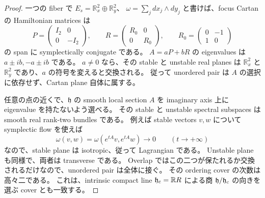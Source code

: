 \begin{proof}
一つの fiber で $E_s=\mathbb R_x^2\oplus\mathbb R_y^2$、
$\omega=\sum_j dx_j\wedge dy_j$ と書けば、focus Cartan の Hamiltonian matrices は
\[
 P=\begin{pmatrix}I_2&0\\0&-I_2\end{pmatrix},\qquad
 R=\begin{pmatrix}R_0&0\\0&R_0\end{pmatrix},\qquad
 R_0=\begin{pmatrix}0&-1\\1&0\end{pmatrix}
\]
の span に symplectically conjugate である。
$A=aP+bR$ の eigenvalues は $a\pm ib,-a\pm ib$ である。
$a\ne0$ なら、その stable と unstable real planes は
$\mathbb R_x^2$ と $\mathbb R_y^2$ であり、$a$ の符号を変えると交換される。
従って unordered pair は $A$ の選択に依存せず、Cartan plane 自体に属する。

任意の点の近くで、$\mathfrak h$ の smooth local section $A$ を
imaginary axis 上に eigenvalue を持たないよう選べる。
その stable と unstable spectral subspaces は smooth real rank-two bundles である。
例えば stable vectors $v,w$ について symplectic flow を使えば
\[
 \omega(v,w)=\omega(e^{tA}v,e^{tA}w)\longrightarrow0\qquad(t\longrightarrow+\infty)
\]
なので、stable plane は isotropic、従って Lagrangian である。
Unstable plane も同様で、両者は transverse である。
Overlap ではこの二つが保たれるか交換されるだけなので、unordered pair は全体に接ぐ。
その ordering cover の次数は高々二である。
これは、intrinsic compact line $\mathfrak h_{\rm c}=\mathbb R R$ による商
$\mathfrak h/\mathfrak h_{\rm c}$ の向きを選ぶ cover とも一致する。
\end{proof}

